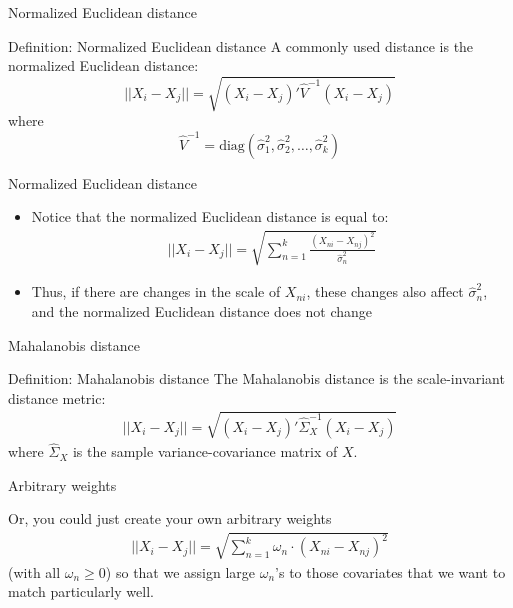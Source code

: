 \documentclass{beamer}
\begin{document}
\begin{frame}{Normalized Euclidean distance}

	\begin{block}{Definition: Normalized Euclidean distance}
	  A commonly used distance is the normalized Euclidean distance:$$||X_i-X_j|| = \sqrt{ (X_i-X_j)'\widehat{V}^{-1}(X_i - X_j) }$$ where
		$$\widehat{V}^{-1} = \text{diag}(\widehat{\sigma}_1^2, \widehat{\sigma}_2^2, \dots, \widehat{\sigma}_k^2)$$
	\end{block}
\end{frame}

\begin{frame}{Normalized Euclidean distance}
	\begin{itemize}
	\item Notice that the normalized Euclidean distance is equal to:
		\begin{eqnarray*}
		||X_i - X_j|| = \sqrt{\sum_{n=1}^k \frac{(X_{ni} - X_{nj})^2}{\widehat{\sigma}^2_n}}
		\end{eqnarray*}
	\item Thus, if there are changes in the scale of $X_{ni}$, these changes also affect $\widehat{\sigma}^2_n$, and the normalized Euclidean distance does not change
	\end{itemize}

\end{frame}


\begin{frame}{Mahalanobis distance}
	
	\begin{block}{Definition: Mahalanobis distance}
	The Mahalanobis distance is the scale-invariant distance metric:
		\begin{eqnarray*}
		||X_i-X_j|| = \sqrt{ (X_i-X_j)'\widehat{\Sigma}_X^{-1}(X_i - X_j) }
		\end{eqnarray*}
	where $\widehat{\Sigma}_X$ is the sample variance-covariance matrix of $X$.
	\end{block}


\end{frame}


\begin{frame}{Arbitrary weights}
	
	Or, you could just create your own arbitrary weights
		\begin{eqnarray*}
		||X_i-X_j|| = \sqrt{ \sum_{n=1}^k \omega_n \cdot (X_{ni} - X_{nj})^2}
		\end{eqnarray*}(with all $\omega_n\geq{0}$) so that we assign large $\omega_n$'s to those covariates that we want to match particularly well.

\end{frame}
\end{document}
